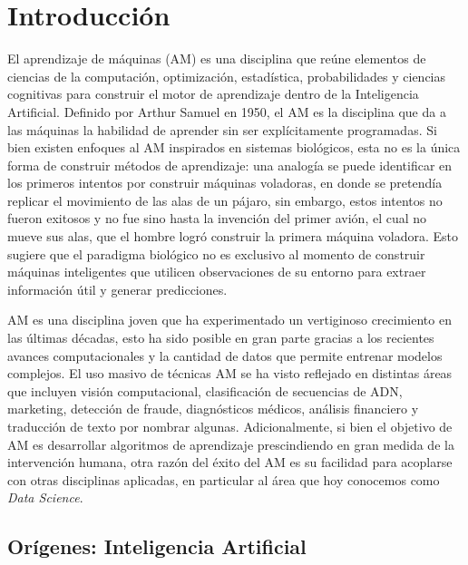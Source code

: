 

\section{Introducción}
\label{cap:intro}


El aprendizaje de máquinas (AM) es una disciplina que reúne elementos de ciencias de la computación, optimización, estadística, probabilidades y ciencias cognitivas para construir el motor de aprendizaje dentro de la Inteligencia Artificial. Definido por Arthur Samuel en 1950, el AM es la disciplina que da a las máquinas la habilidad de aprender sin ser explícitamente programadas. Si bien existen enfoques al AM inspirados en sistemas biológicos, esta no es la única forma de construir métodos de aprendizaje: una analogía se puede identificar en los primeros intentos por construir máquinas voladoras, en donde se pretendía replicar el movimiento de las alas de un pájaro, sin embargo, estos intentos no fueron exitosos y no fue sino hasta la invención del primer avión, el cual no mueve sus alas, que el hombre logró construir la primera máquina voladora. Esto sugiere que el paradigma biológico no es exclusivo al momento de construir máquinas inteligentes que utilicen observaciones de su entorno para extraer información útil y generar predicciones. 


AM es una disciplina joven que ha experimentado un vertiginoso crecimiento en las últimas décadas, esto ha sido posible en gran parte gracias a los recientes avances computacionales y la cantidad de datos que permite entrenar modelos complejos. El uso masivo de técnicas AM se ha visto reflejado en distintas áreas que incluyen visión computacional, clasificación de secuencias de ADN, marketing, detección de fraude, diagnósticos médicos, análisis financiero y traducción de texto por nombrar algunas. Adicionalmente, si bien el objetivo de AM es desarrollar algoritmos de aprendizaje prescindiendo en gran medida de la intervención humana,  otra razón del éxito del AM es su facilidad para acoplarse con otras disciplinas aplicadas, en particular al área que hoy conocemos como \textit{Data Science}. 

\subsection{Orígenes: Inteligencia Artificial}

